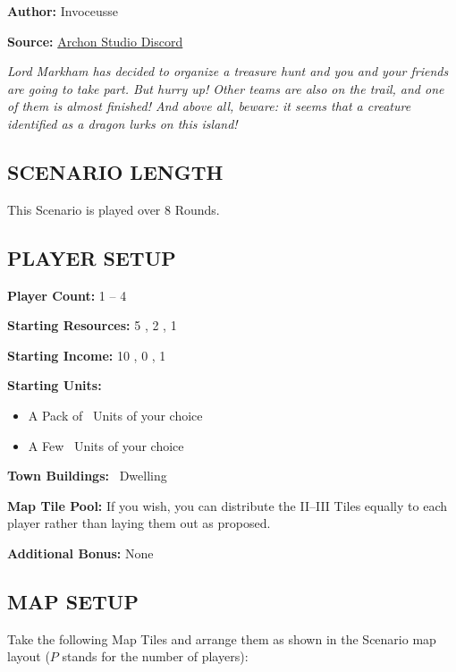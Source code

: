 
\begin{multicols*}{2}

\textbf{Author:} Invoceusse

\textbf{Source:} \href{https://discord.com/channels/740870068178649108/1222679455261261986}{Archon Studio Discord}

\textit{Lord Markham has decided to organize a treasure hunt and you and your friends are going to take part.
  But hurry up! Other teams are also on the trail, and one of them is almost finished!
  And above all, beware: it seems that a creature identified as a dragon lurks on this island!}
\subsection*{\MakeUppercase{Scenario Length}}

This Scenario is played over 8 Rounds.

\subsection*{\MakeUppercase{Player Setup}}

\textbf{Player Count:} 1 -- 4

\textbf{Starting Resources:} 5 , 2 , 1 

\textbf{Starting Income:} 10 , 0 , 1 

\textbf{Starting Units:}
\begin{itemize}
  \item A Pack of \bronze\ Units of your choice
  \item A Few \bronze\ Units of your choice
\end{itemize}

\textbf{Town Buildings:} \bronze\ Dwelling

\textbf{Map Tile Pool:} If you wish, you can distribute the II--III Tiles equally to each player rather than laying them out as proposed.

\textbf{Additional Bonus:} None

\subsection*{\MakeUppercase{Map Setup}}

Take the following Map Tiles and arrange them as shown in the Scenario map layout ($P$ stands for the number of players):


\end{multicols*}
